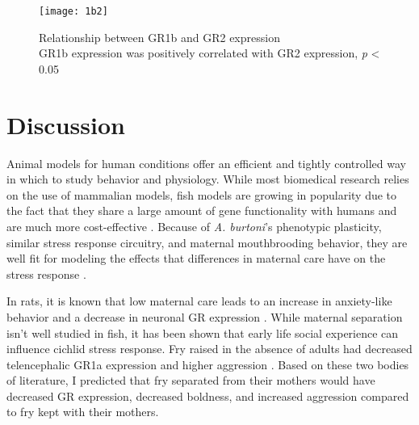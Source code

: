 \documentclass[12pt,twoside]{reedthesis}
\begin{document}
\begin{figure}[htbp] 
\begin{center} 
\texttt{[image: 1b2]}
\caption[Relationship between GR1b and GR2
expression]{\footnotesize{Relationship between GR1b and GR2 expression\\ GR1b
    expression was positively correlated with GR2 expression, \textit{p} < 0.05}}
\label{subd}
\end{center} 
\end{figure}


\chapter{Discussion}

Animal models for human conditions offer an efficient and tightly controlled way
in which to study behavior and physiology. While most biomedical research
relies on the use of mammalian models, fish models are growing in popularity due to
the fact that they share a large amount of gene
functionality with humans and are much more cost-effective
\citep{cech_cellular_2011}. 
Because of \textit{A. burtoni}'s phenotypic plasticity, similar stress
response circuitry, and maternal
mouthbrooding behavior, they are well fit for modeling the effects that
differences in maternal care have on the stress response
\citep{greenwood_multiple_2003, pijanowski_activity_2015, renn_fish_2008}.

In rats, it is known that low
maternal care leads to an increase in anxiety-like behavior and a decrease
in neuronal GR expression \citep{caldji_maternal_1998}. While maternal
separation isn't well studied in fish, it has been shown that early life
social experience can influence cichlid stress response. Fry raised in the
absence of adults had decreased telencephalic GR1a expression and higher
aggression \citep{nyman_effect_2017, arnold_social_2010}.  Based on these two bodies of literature, I predicted
that fry separated from their mothers would have decreased GR expression,
decreased boldness, and increased aggression compared to fry kept with their mothers. 
\end{document}
